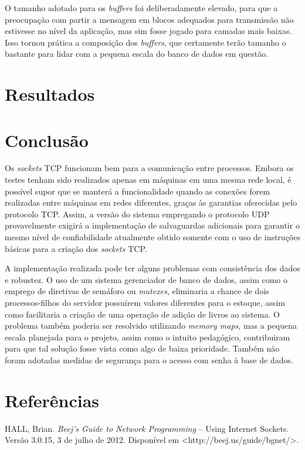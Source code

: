 \documentclass[11pt, brazil]{article} %
\begin{document}
O tamanho adotado para os \emph{buffers} foi deliberadamente elevado, para que a preocupação com partir a mensagem em blocos adequados para transmissão não estivesse no nível da aplicação, mas sim fosse jogado para camadas mais baixas. Isso tornou prática a composição dos \emph{buffers}, que certamente terão tamanho o bastante para lidar com a pequena escala do banco de dados em questão.

\section{Resultados}

\section{Conclusão}

Os \emph{sockets} TCP funcionam bem para a comunicação entre processos. Embora os testes tenham sido realizados apenas em máquinas em uma mesma rede local, é possível supor que se manterá a funcionalidade quando as conexões forem realizadas entre máquinas em redes diferentes, graças às garantias oferecidas pelo protocolo TCP. Assim, a versão do sistema empregando o protocolo UDP provavelmente exigirá a implementação de salvaguardas adicionais para garantir o mesmo nível de confiabilidade atualmente obtido somente com o uso de instruções básicas para a criação dos \emph{sockets} TCP.

A implementação realizada pode ter alguns problemas com consistência dos dados e robustez. O uso de um sistema gerenciador de banco de dados, assim como o emprego de diretivas de semáforo ou \emph{mutexes}, eliminaria a chance de dois processos-filhos do servidor possuírem valores diferentes para o estoque, assim como facilitaria a criação de uma operação de adição de livros ao sistema. O problema também poderia ser resolvido utilizando \emph{memory maps}, mas a pequena escala planejada para o projeto, assim como o intuito pedagógico, contribuiram para que tal solução fosse vista como algo de baixa prioridade. Também não foram adotadas medidas de segurança para o acesso com senha à base de dados.

\section{Referências}

HALL, Brian. \emph{Beej's Guide to Network Programming} -- Using Internet Sockets. Versão 3.0.15, 3 de julho de 2012. Disponível em <http://beej.us/guide/bgnet/>.
\end{document}
